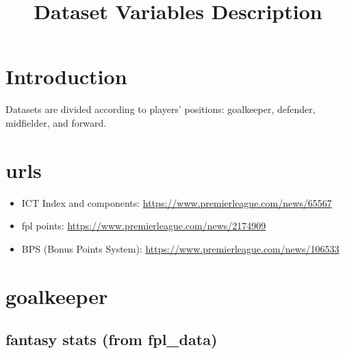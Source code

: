\documentclass{article}
\title{Dataset Variables Description}
\author{}
\date{}
\begin{document}
\maketitle

\section*{Introduction}
Datasets are divided according to players' positions: goalkeeper, defender, midfielder, and forward.

\section*{urls}

\begin{itemize}
    \item ICT Index and components: \url{https://www.premierleague.com/news/65567}
    \item fpl points: \url{https://www.premierleague.com/news/2174909}
    \item BPS (Bonus Points System): \url{https://www.premierleague.com/news/106533}
\end{itemize}


\section{goalkeeper}

\subsection{fantasy stats (from fpl\_data)}
\end{document}
